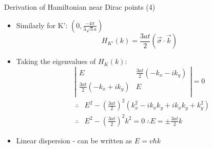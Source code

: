\documentclass{beamer}
\begin{document}
\begin{frame}[t]{Derivation of Hamiltonian near Dirac points (4)}
\begin{itemize}
\item Similarly for K': $\left (0, \frac{-4\pi}{3\sqrt{3}a} \right)$
\begin{equation}
  H_{K'}(k) = \frac{3at}{2}\left ( \vec{\sigma} \cdot \vec{k} \right )
  \end{equation}
    \item Taking the eigenvalues of $H_K(k)$:
  \begin{equation}
  \left | \begin{array}{cc} E & \frac{3at}{2} \left (  -k_x - i k_y \right ) \\ \frac{3at}{2} \left (  -k_x + ik_y \right ) & E\\ \end{array} \right | =0
  \end{equation}
    \begin{eqnarray}
  &\therefore& E^2 - \left ( \frac{3at}{2} \right )^2 \left (k_x^2 - ik_x k_y + i k_x k_y + k_y ^2 \right )\\
  &\therefore& E^2 - \left ( \frac{3at}{2} \right )^2 k^2 =0 ~ \therefore E = \pm \frac{3at}{2} k
  \end{eqnarray}
\item Linear dispersion - can be written as $E = v\hbar k$
\end{itemize}
\end{frame}



\end{document}
